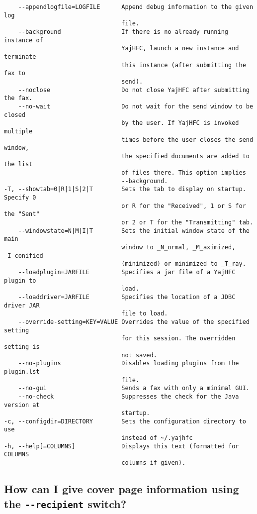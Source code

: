 \documentclass[a4paper,10pt]{scrartcl}
\begin{document}
\begin{verbatim}
    --appendlogfile=LOGFILE      Append debug information to the given log 
                                 file. 
    --background                 If there is no already running instance of 
                                 YajHFC, launch a new instance and terminate 
                                 this instance (after submitting the fax to 
                                 send). 
    --noclose                    Do not close YajHFC after submitting the fax. 
    --no-wait                    Do not wait for the send window to be closed 
                                 by the user. If YajHFC is invoked multiple 
                                 times before the user closes the send window, 
                                 the specified documents are added to the list 
                                 of files there. This option implies 
                                 --background. 
-T, --showtab=0|R|1|S|2|T        Sets the tab to display on startup. Specify 0 
                                 or R for the "Received", 1 or S for the "Sent"
                                 or 2 or T for the "Transmitting" tab. 
    --windowstate=N|M|I|T        Sets the initial window state of the main 
                                 window to _N_ormal, _M_aximized, _I_conified 
                                 (minimized) or minimized to _T_ray. 
    --loadplugin=JARFILE         Specifies a jar file of a YajHFC plugin to 
                                 load. 
    --loaddriver=JARFILE         Specifies the location of a JDBC driver JAR 
                                 file to load. 
    --override-setting=KEY=VALUE Overrides the value of the specified setting 
                                 for this session. The overridden setting is 
                                 not saved. 
    --no-plugins                 Disables loading plugins from the plugin.lst 
                                 file. 
    --no-gui                     Sends a fax with only a minimal GUI. 
    --no-check                   Suppresses the check for the Java version at 
                                 startup. 
-c, --configdir=DIRECTORY        Sets the configuration directory to use 
                                 instead of ~/.yajhfc 
-h, --help[=COLUMNS]             Displays this text (formatted for COLUMNS 
                                 columns if given). 
\end{verbatim}

\subsection{How can I give cover page information using the \texttt{-{-}recipient} switch?}
\end{document}
